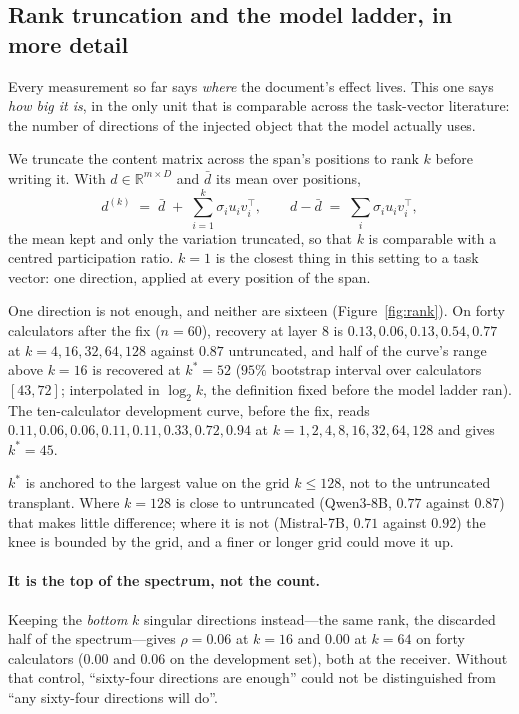 \documentclass{article}
\newcommand{\dvec}{\ensuremath{d}}
\begin{document}
\subsection{Rank truncation and the model ladder, in more detail}
\label{app:rank2}

Every measurement so far says \emph{where} the document's effect lives. This one
says \emph{how big it is}, in the only unit that is comparable across the
task-vector literature: the number of directions of the injected object that the
model actually uses.

We truncate the content matrix across the span's positions to rank $k$ before
writing it. With $\dvec \in \mathbb{R}^{m \times D}$ and $\bar{\dvec}$ its mean
over positions,
\begin{equation}
\dvec^{(k)} \;=\; \bar{\dvec} \;+\; \sum_{i=1}^{k} \sigma_i u_i v_i^{\top},
\qquad
\dvec - \bar{\dvec} \;=\; \textstyle\sum_i \sigma_i u_i v_i^{\top},
\end{equation}
the mean kept and only the variation truncated, so that $k$ is comparable with a
centred participation ratio. $k=1$ is the closest thing in this setting to a
task vector: one direction, applied at every position of the span.

One direction is not enough, and neither are sixteen
(Figure~\ref{fig:rank}). On forty calculators after the fix ($n=60$), recovery
at layer $8$ is $0.13, 0.06, 0.13, 0.54, 0.77$ at $k = 4, 16, 32, 64, 128$
against $0.87$ untruncated, and half of the curve's range above $k=16$ is
recovered at $k^{*}=52$ ($95\%$ bootstrap interval over calculators $[43, 72]$;
interpolated in $\log_2 k$, the definition fixed before the model ladder ran).
The ten-calculator development curve, before the fix, reads
$0.11, 0.06, 0.06, 0.11, 0.11, 0.33, 0.72, 0.94$ at $k = 1,2,4,8,16,32,64,128$
and gives $k^{*}=45$.

$k^{*}$ is anchored to the largest value on the grid $k \le 128$, not to the
untruncated transplant. Where $k=128$ is close to untruncated (Qwen3-8B, $0.77$
against $0.87$) that makes little difference; where it is not (Mistral-7B,
$0.71$ against $0.92$) the knee is bounded by the grid, and a finer or longer
grid could move it up.

\paragraph{It is the top of the spectrum, not the count.} Keeping the
\emph{bottom} $k$ singular directions instead---the same rank, the discarded
half of the spectrum---gives $\rho = 0.06$ at $k=16$ and $0.00$ at $k=64$ on
forty calculators ($0.00$ and $0.06$ on the development set), both at the
receiver. Without that control, ``sixty-four directions are enough'' could not
be distinguished from ``any sixty-four directions will do''.
\end{document}
